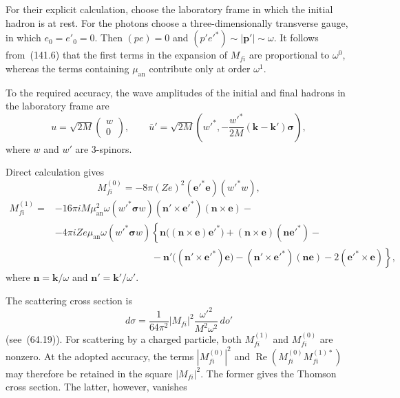 For their explicit calculation, choose the laboratory frame in which the initial hadron is at rest. For the photons choose a three-dimensionally transverse gauge, in which $e_0=e'_0=0$. Then $(pe)=0$ and $(p'e'^{*})\sim|\mathbf p'|\sim\omega$. It follows from~(141.6) that the first terms in the expansion of $M_{fi}$ are proportional to $\omega^0$, whereas the terms containing $\mu_{\text{an}}$ contribute only at order $\omega^1$.

To the required accuracy, the wave amplitudes of the initial and final hadrons in the laboratory frame are
\[
u=\sqrt{2M}\begin{pmatrix}w\\0\end{pmatrix},\qquad
\bar u'=\sqrt{2M}\left(w'^{*},-\frac{w'^{*}}{2M}(\mathbf k-\mathbf k')\boldsymbol{\sigma}\right),
\]
where $w$ and $w'$ are 3-spinors.

Direct calculation gives
\begin{equation}
M_{fi}^{(0)}=-8\pi(Ze)^2(\mathbf e'^{*}\mathbf e)(w'^{*}w),
\tag{141.8}
\end{equation}
\begin{equation}
\begin{aligned}
M_{fi}^{(1)}={}&-16\pi iM\mu_{\text{an}}^2\omega
(w'^{*}\boldsymbol{\sigma}w)
(\mathbf n'\times\mathbf e'^{*})(\mathbf n\times\mathbf e)-{}\\
&-4\pi iZe\mu_{\text{an}}\omega(w'^{*}\boldsymbol{\sigma}w)
\left\{\mathbf n\bigl((\mathbf n\times\mathbf e)\mathbf e'^{*}\bigr)
+(\mathbf n\times\mathbf e)(\mathbf n\mathbf e'^{*})-{}\right.\\
&\hspace{10em}\left.{}-\mathbf n'\bigl((\mathbf n'\times\mathbf e'^{*})\mathbf e\bigr)
-(\mathbf n'\times\mathbf e'^{*})(\mathbf n\mathbf e)
-2(\mathbf e'^{*}\times\mathbf e)\right\},
\end{aligned}
\tag{141.9}
\end{equation}
where $\mathbf n=\mathbf k/\omega$ and $\mathbf n'=\mathbf k'/\omega'$.

The scattering cross section is
\begin{equation}
d\sigma=\frac{1}{64\pi^2}|M_{fi}|^2\frac{\omega'^2}{M^2\omega^2}\,do'
\tag{141.10}
\end{equation}
(see~(64.19)). For scattering by a charged particle, both $M_{fi}^{(1)}$ and $M_{fi}^{(0)}$ are nonzero. At the adopted accuracy, the terms $|M_{fi}^{(0)}|^2$ and $\operatorname{Re}(M_{fi}^{(0)}M_{fi}^{(1)*})$ may therefore be retained in the square $|M_{fi}|^2$. The former gives the Thomson cross section. The latter, however, vanishes

